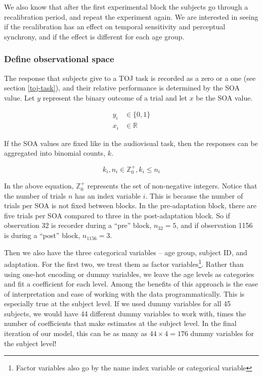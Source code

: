 \documentclass[11pt, oneside, openany]{scrbook}
\begin{document}
We also know that after the first experimental block the subjects go through a recalibration period, and repeat the experiment again. We are interested in seeing if the recalibration has an effect on temporal sensitivity and perceptual synchrony, and if the effect is different for each age group.

\hypertarget{define-observational-space}{%
\subsubsection{Define observational space}\label{define-observational-space}}

The response that subjects give to a TOJ task is recorded as a zero or a one (see section \ref{toj-task}), and their relative performance is determined by the SOA value. Let \(y\) represent the binary outcome of a trial and let \(x\) be the SOA value.

\begin{align*}
y_i &\in \lbrace 0, 1\rbrace \\
x_i &\in \mathbb{R}
\end{align*}

If the SOA values are fixed like in the audiovisual task, then the responses can be aggregated into binomial counts, \(k\).

\[
k_i, n_i \in \mathbb{Z}_0^+, k_i \le n_i
\]

In the above equation, \(\mathbb{Z}_0^+\) represents the set of non-negative integers. Notice that the number of trials \(n\) has an index variable \(i\). This is because the number of trials per SOA is not fixed between blocks. In the pre-adaptation block, there are five trials per SOA compared to three in the post-adaptation block. So if observation 32 is recorder during a ``pre'' block, \(n_{32} = 5\), and if observation 1156 is during a ``post'' block, \(n_{1156} = 3\).

Then we also have the three categorical variables -- age group, subject ID, and adaptation. For the first two, we treat them as factor variables\footnote{Factor variables also go by the name index variable or categorical variable}. Rather than using one-hot encoding or dummy variables, we leave the age levels as categories and fit a coefficient for each level. Among the benefits of this approach is the ease of interpretation and ease of working with the data programmatically. This is especially true at the subject level. If we used dummy variables for all 45 subjects, we would have 44 different dummy variables to work with, times the number of coefficients that make estimates at the subject level. In the final iteration of our model, this can be as many as \(44 \times 4 = 176\) dummy variables for the subject level!
\end{document}

